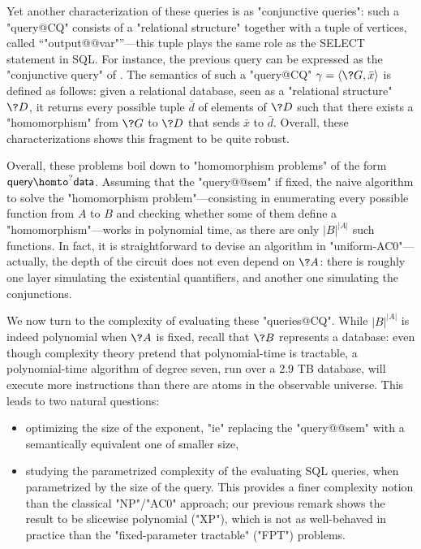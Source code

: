 Yet another characterization of these queries is as "conjunctive queries": such a "query@CQ"
consists of a "relational structure" together with a tuple of vertices, called ``"output@@var"''---this tuple
plays the same role as the \textsf{SELECT} statement in SQL.
For instance, the previous query can be expressed as the "conjunctive query"
of . The semantics of such a "query@CQ"
$\gamma = \tup{\?G, \bar x}$ is defined as follows:
given a relational database, seen as a "relational structure" $\?D$,
it returns every possible tuple $\bar d$ of elements of $\?D$ such that
there exists a "homomorphism" from $\?G$ to $\?D$ that sends $\bar x$ to $\bar d$.
Overall, these characterizations shows this fragment to be quite robust.

Overall, these problems boil down to
"homomorphism problems" of the form $\textsf{query} \homto^? \textsf{data}$.
Assuming that the "query@@sem" if fixed,
the naive algorithm to solve the "homomorphism problem"---consisting in enumerating
every possible function from $A$ to $B$ and checking whether some of them
define a "homomorphism"---works in polynomial time, as there are only $|B|^{|A|}$ such functions.
In fact, it is straightforward to devise an algorithm in "uniform-AC0"---actually, the depth
of the circuit does not even depend on $\?A$: there is roughly one layer simulating the
existential quantifiers, and another one simulating the conjunctions.

We now turn to the complexity of evaluating these "queries@CQ".
While $|B|^{|A|}$ is indeed polynomial when $\?A$ is fixed,
recall that $\?B$ represents a database:
even though complexity theory pretend that polynomial-time is tractable,
a polynomial-time algorithm of degree seven,
run over a 2.9 TB database, will execute more instructions
than there are atoms in the observable universe.
This leads to two natural questions:
\begin{itemize}
	\item optimizing the size of the exponent, "ie"
		replacing the "query@@sem" with a semantically equivalent one of smaller size,
	\item studying the parametrized complexity of the evaluating SQL queries, when parametrized by
		the size of the query. This provides a finer complexity notion than
		the classical "NP"/"AC0" approach; our previous remark shows the result to be
		slicewise polynomial ("XP"), which is not as well-behaved in practice than
		the "fixed-parameter tractable" ("FPT") problems.
\end{itemize}

